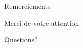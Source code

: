 \documentclass[aspectratio=169]{beamer}  %
\begin{document}
\begin{frame}{Remerciements}
    \begin{center}
        \Large Merci de votre attention
        \vspace{1cm}
        
        \normalsize
        Questions?
    \end{center}
\end{frame}
\end{document}

